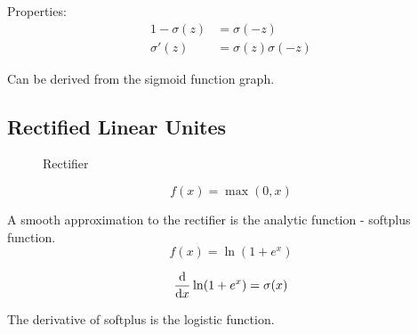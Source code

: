 \documentclass[a4paper]{report}
\begin{document}
Properties:
\begin{align*}
1-\sigma(z) &= \sigma(-z) \\
\sigma'(z) &= \sigma(z)\sigma(-z)
\end{align*}

Can be derived from the sigmoid function graph. 

\subsection{Rectified Linear Unites}
\begin{figure}[!htp]
\centering
{}
\caption{Rectifier}
\label{fig:rectifier}
\end{figure}
$$
f(x) = \max(0, x)
$$

A smooth approximation to the rectifier is the analytic function - softplus function.
$$
f(x) = \ln(1 + e^x)
$$

$$
\frac{\mathop{}\!\mathrm{d}}{\mathop{}\!\mathrm{d} x} \ln(1 + e^x) = \sigma(x)
$$

The derivative of softplus is the logistic function.
\end{document}
